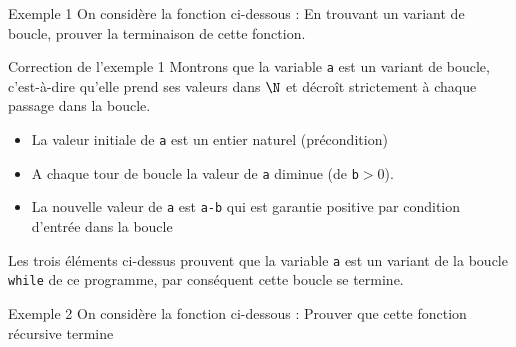\documentclass[10pt]{beamer}
\begin{document}
\begin{frame}[fragile]{\Ctitle}{\stitle}
\begin{exampleblock}{Exemple 1}
    On considère la fonction ci-dessous :
     En trouvant un variant de boucle, prouver la terminaison de cette fonction.
\end{exampleblock}
\end{frame}

\begin{frame}[fragile]{\Ctitle}{\stitle}
\begin{exampleblock}{Correction de l'exemple 1}
    \textcolor{OliveGreen}{Montrons que la variable {\tt a} est un variant de boucle, c'est-à-dire qu'elle prend ses valeurs dans $\N$ et  décroît strictement à chaque passage dans la boucle.}
    \begin{itemize}
        \item<2->{\textcolor{OliveGreen}{La valeur initiale de \texttt{a} est un entier naturel (précondition)}}
        \item<3->{\textcolor{OliveGreen}{A chaque tour de boucle la valeur de \texttt{a} diminue (de \texttt{b}$>0$).}}
        \item<4->{\textcolor{OliveGreen}{La nouvelle valeur de \texttt{a} est \texttt{a-b} qui est garantie positive par condition d'entrée dans la boucle}}
    \end{itemize}
    \textcolor{OliveGreen}{Les trois éléments ci-dessus prouvent que la variable {\tt a} est un variant de la boucle {\tt while} de ce programme, par conséquent cette boucle se termine.}
\end{exampleblock}
\end{frame}

\begin{frame}[fragile]{\Ctitle}{\stitle}
    \begin{exampleblock}{Exemple 2}
        On considère la fonction ci-dessous :
         Prouver que cette fonction récursive termine
    \end{exampleblock}
    \end{frame}
    
\end{document}
